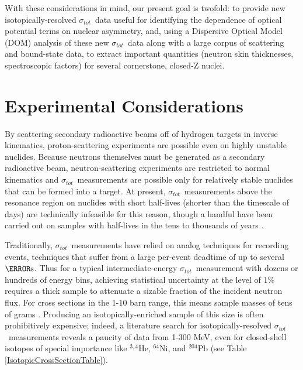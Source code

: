 \documentclass[twocolumn,secnumarabic,amssymb, nobibnotes, aps, prl,
superscriptaddress, nobalancelastpage]{revtex4}
\newcommand{\tot}{\ensuremath{\sigma_{tot}}}
\begin{document}
With these considerations in mind, our present goal is twofold: to
provide new isotopically-resolved \tot\ data useful for identifying the 
dependence of optical 
potential terms on nuclear asymmetry, and, using a Dispersive Optical Model
(DOM) analysis of these new \tot\ data along with a large corpus of scattering
and bound-state data, to extract important quantities (neutron skin
thicknesses, spectroscopic factors) for several cornerstone, closed-Z nuclei.


\section{Experimental Considerations}
By scattering secondary radioactive beams off of hydrogen targets in inverse
kinematics, proton-scattering experiments are possible even on highly unstable
nuclides. Because neutrons themselves must be generated as a
secondary radioactive beam, neutron-scattering experiments are restricted to
normal kinematics and \tot\ measurements are possible only for relatively stable
nuclides that can be formed into a target. At present, \tot\ measurements above
the resonance region on nuclides with short half-lives (shorter than the timescale of
days) are technically infeasible for this reason, though a handful have been carried out on
samples with half-lives in the tens to thousands of years \cite{Poenitz1983,
Phillips1980, Foster1971}.

Traditionally, \tot\ measurements have relied on analog techniques for recording
events, techniques that suffer from a large per-event deadtime of
up to several $\micro\second$. Thus for a typical intermediate-energy \tot\ measurement
with dozens or hundreds of energy bins, achieving statistical uncertainty at the
level of 1\% requires a thick sample to attenuate a sizable fraction of the
incident neutron flux. For cross sections in the 1-10 barn range, this means
sample masses of tens of grams \cite{Finlay1993, Abfalterer2001}.
Producing an isotopically-enriched sample of this size is often
prohibitively expensive; indeed, a literature search for isotopically-resolved
\tot\ measurements reveals a paucity of data from 1-300 MeV, even for
closed-shell isotopes of special importance like $^{3,4}$He, $^{64}$Ni, and
$^{204}$Pb (see Table \ref{IsotopicCrossSectionTable}).
\end{document}
